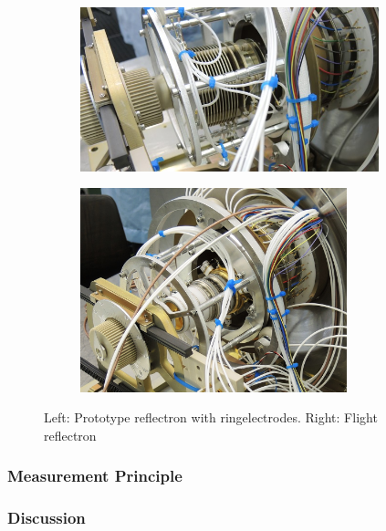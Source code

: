 	\begin{figure}[h]
		\begin{subfigure}{0.5\textwidth}
			\centering
			\includegraphics[width = 0.95\textwidth]{Experiments/reflectron_Prototype1.jpg}
		\end{subfigure}
		\begin{subfigure}{0.5\textwidth}
			\centering
			\includegraphics[width = 0.85\textwidth]{Experiments/reflectron_flight.JPG}
		\end{subfigure}
		\caption{Left: Prototype reflectron with ringelectrodes. Right: Flight reflectron}
		\label{fig:ExpRefl}
	\end{figure}

	\subsubsection{Measurement Principle}\label{subsec:ReflecMeasPric}
	
	\subsubsection{Discussion}\label{subsec:ReflecDissc}
	
